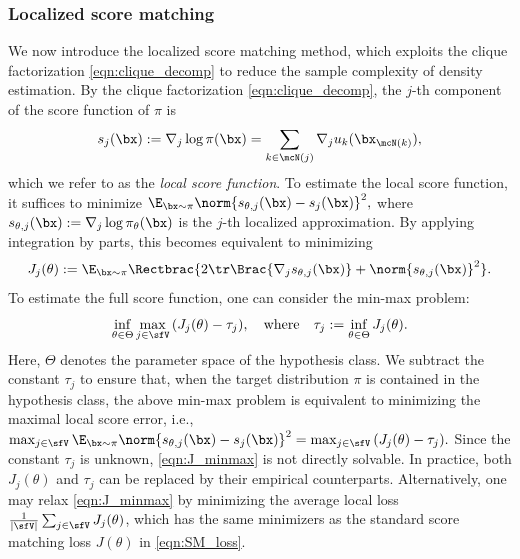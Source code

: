 \documentclass[11pt]{article}
\begin{document}
\subsubsection{Localized score matching}
\label{sec:LSM_detail}

We now introduce the localized score matching method, which exploits the clique factorization \eqref{eqn:clique_decomp} to reduce the sample complexity of density estimation.
%
By the clique factorization \eqref{eqn:clique_decomp}, the $j$-th component of the score function of $\pi$ is
\begin{equation}
    s_j(\bx) := \nabla_j \log \pi(\bx) = \sum_{k \in \mcN(j)} \nabla_j u_k(\bx_{\mcN(k)}),
\end{equation}
which we refer to as the \emph{local score function}. To estimate the local score function, it suffices to minimize
\(
    \E_{\bx \sim \pi} \norm{ s_{\theta,j}(\bx) - s_j(\bx) }^2,
\)
where $s_{\theta,j}(\bx) := \nabla_j \log \pi_\theta (\bx)$ is the $j$-th localized approximation. By applying integration by parts, this becomes equivalent to minimizing
\begin{equation}
\label{eqn:J_j}
    J_j(\theta) := \E_{\bx \sim \pi} \Rectbrac{ 2 \tr \Brac{ \nabla_j s_{\theta,j} (\bx) } + \norm{s_{\theta,j}(\bx)}^2 }.
\end{equation}
To estimate the full score function, one can consider the min-max problem:
\begin{equation}
\label{eqn:J_minmax}
    \inf_{\theta\in\Theta} \max_{j \in \sfV}\, ( J_j(\theta) - \tau_j), \quad \text{where} \quad \tau_j := \inf_{\theta \in \Theta} J_j(\theta).
\end{equation}
Here, $\Theta$ denotes the parameter space of the hypothesis class.
We subtract the constant $\tau_j$ to ensure that, when the target distribution $\pi$ is contained in the hypothesis class, the above min-max problem is equivalent to minimizing the maximal local score error, i.e.,
\(
    \max_{j\in \sfV} \E_{\bx \sim \pi} \norm{ s_{\theta,j}(\bx) - s_j(\bx) }^2 = \max_{j\in \sfV}\, ( J_j(\theta) - \tau_j ).
\)
Since the constant $\tau_j$ is unknown, \eqref{eqn:J_minmax} is not directly solvable.
In practice, both $J_j(\theta)$ and $\tau_j$ can be replaced by their empirical counterparts.
Alternatively, one may relax \eqref{eqn:J_minmax} by minimizing the average local loss $\frac{1}{|\sfV|}\sum_{j\in \sfV} J_j(\theta)$, which has the same minimizers as the standard score matching loss $J(\theta)$ in \eqref{eqn:SM_loss}.
\end{document}

